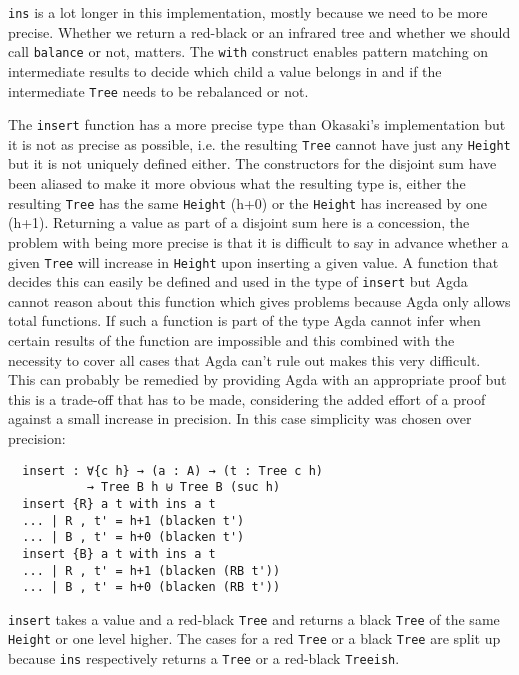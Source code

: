 \documentclass[journal, retainorgcmds]{IEEEtran}
\newcommand{\iagda}[1]{\texttt{#1}}
\begin{document}
\iagda{ins} is a lot longer in this implementation, mostly because we need to
be more precise.
Whether we return a red-black or an infrared tree and whether we should call
\iagda{balance} or not, matters.
The \iagda{with} construct enables pattern matching on intermediate results to
decide which child a value belongs in and if the intermediate \iagda{Tree}
needs to be rebalanced or not.

The \iagda{insert} function has a more precise type than Okasaki's
implementation but it is not as precise as possible, i.e. the resulting
\iagda{Tree} cannot have just any \iagda{Height} but it is not uniquely defined
either.
The constructors for the disjoint sum have been aliased to make it more obvious
what the resulting type is, either the resulting \iagda{Tree} has the same
\iagda{Height} (h+0) or the \iagda{Height} has increased by one (h+1).
Returning a value as part of a disjoint sum here is a concession, the problem
with being more precise is that it is difficult to say in advance whether a
given \iagda{Tree} will increase in \iagda{Height} upon inserting a given value.
A function that decides this can easily be defined and used in the type of
\iagda{insert} but Agda cannot reason about this function which gives problems
because Agda only allows total functions.
If such a function is part of the type Agda cannot infer when certain results
of the function are impossible and this combined with the necessity to cover
all cases that Agda can't rule out makes this very difficult.
This can probably be remedied by providing Agda with an appropriate proof but
this is a trade-off that has to be made, considering the added effort of a
proof against a small increase in precision.
In this case simplicity was chosen over precision:

\begin{verbatim}
  insert : ∀{c h} → (a : A) → (t : Tree c h)
           → Tree B h ⊎ Tree B (suc h)
  insert {R} a t with ins a t
  ... | R , t' = h+1 (blacken t')
  ... | B , t' = h+0 (blacken t')
  insert {B} a t with ins a t
  ... | R , t' = h+1 (blacken (RB t'))
  ... | B , t' = h+0 (blacken (RB t'))
\end{verbatim}

\iagda{insert} takes a value and a red-black \iagda{Tree} and returns a black
\iagda{Tree} of the same \iagda{Height} or one level higher.
The cases for a red \iagda{Tree} or a black \iagda{Tree} are split up because
\iagda{ins} respectively returns a \iagda{Tree} or a red-black \iagda{Treeish}.
\end{document}

